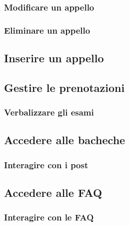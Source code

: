\documentclass [a4paper,11pt]{book}
\begin{document}

\subsubsection{Modificare un appello}

\medskip

\subsubsection{Eliminare un appello}

\medskip

\subsection{Inserire un appello}


\medskip

\subsection{Gestire le prenotazioni}


\subsubsection{Verbalizzare gli esami}

\medskip

\subsection{Accedere alle bacheche}


\subsubsection{Interagire con i post}

\medskip

\subsection{Accedere alle FAQ}


\subsubsection{Interagire con le FAQ}
\end{document}
